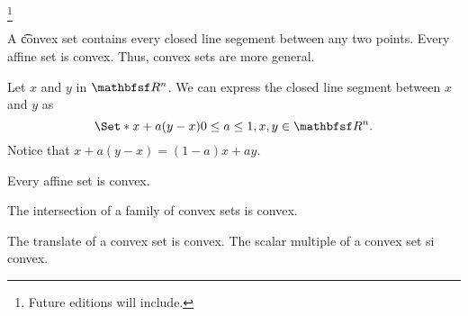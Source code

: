 
\footnote{Future editions will include.}



A \t{convex set} contains every closed line segement between any two points.
Every affine set is convex.
Thus, convex sets are more general.


Let $x$ and $y$ in $\R^n$. We can express the closed line segment between $x$ and $y$ as
$$
  \Set*{x + a(y - x)}{0 \leq a \leq 1, x, y \in \R^n}.
$$
Notice that $x + a(y - x) = (1-a)x + ay$.


\begin{prop}
  Every affine set is convex.
\end{prop}

\begin{prop}
  The intersection of a family of convex sets is convex.
\end{prop}

\begin{prop}
  The translate of a convex set is convex.
  The scalar multiple of a convex set si convex.
\end{prop}

\blankpage

%
%
%
%
%
%
%
%
%
%
%
%
